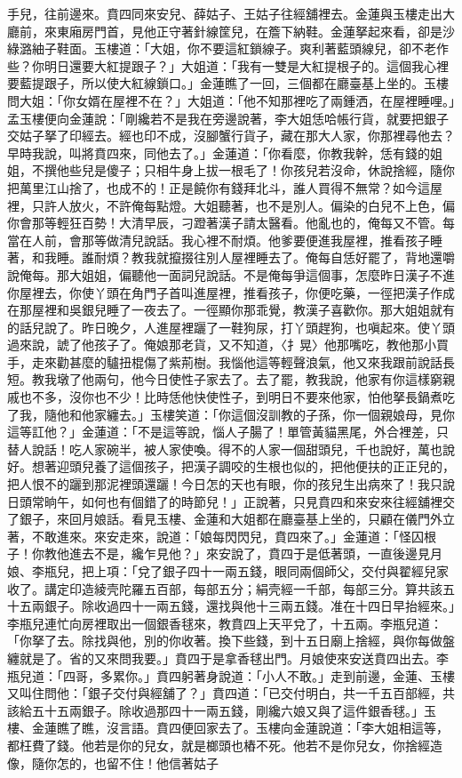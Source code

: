 \begin{showcontents}{}
手兒，往前邊來。賁四同來安兒、薛姑子、王姑子往經舖裡去。金蓮與玉樓走出大廳前，來東廂房門首，見他正守著針線筐兒，在簷下納鞋。金蓮拏起來看，卻是沙綠潞紬子鞋面。玉樓道：「大姐，你不要這紅鎖線子。爽利著藍頭線兒，卻不老作些？你明日還要大紅提跟子？」大姐道：「我有一雙是大紅提根子的。這個我心裡要藍提跟子，所以使大紅線鎖口。」金蓮瞧了一回，三個都在廳臺基上坐的。玉樓問大姐：「你女婿在屋裡不在？」大姐道：「他不知那裡吃了兩鍾洒，在屋裡睡哩。」孟玉樓便向金蓮說：「剛纔若不是我在旁邊說著，李大姐恁哈帳行貨，就要把銀子交姑子拏了印經去。經也印不成，沒腳蟹行貨子，藏在那大人家，你那裡尋他去？早時我說，叫將賁四來，同他去了。」金蓮道：「你看麼，你教我幹，恁有錢的姐姐，不撰他些兒是傻子；只相牛身上拔一根毛了！你孩兒若沒命，休說捨經，隨你把萬里江山捨了，也成不的！正是饒你有錢拜北斗，誰人買得不無常？如今這屋裡，只許人放火，不許俺每點燈。大姐聽著，也不是別人。偏染的白兒不上色，偏你會那等輕狂百勢！大清早辰，刁蹬著漢子請太醫看。他亂也的，俺每又不管。每當在人前，會那等做清兒說話。我心裡不耐煩。他爹要便進我屋裡，推看孩子睡著，和我睡。誰耐煩？教我就攛掇往別人屋裡睡去了。俺每自恁好罷了，背地還嚼說俺每。那大姐姐，偏聽他一面詞兒說話。不是俺每爭這個事，怎麼昨日漢子不進你屋裡去，你使丫頭在角門子首叫進屋裡，推看孩子，你便吃藥，一徑把漢子作成在那屋裡和吳銀兒睡了一夜去了。一徑顯你那乖覺，教漢子喜歡你。那大姐姐就有的話兒說了。昨日晚夕，人進屋裡躧了一鞋狗尿，打丫頭趕狗，也嗔起來。使丫頭過來說，諕了他孩子了。俺娘那老貨，又不知道，〈扌晃〉他那嘴吃，教他那小買手，走來勸甚麼的驢扭棍傷了紫荊樹。我惱他這等輕聲浪氣，他又來我跟前說話長短。教我墩了他兩句，他今日使性子家去了。去了罷，教我說，他家有你這樣窮親戚也不多，沒你也不少！比時恁他快使性子，到明日不要來他家，怕他拏長鍋煮吃了我，隨他和他家纏去。」玉樓笑道：「你這個沒訓教的子孫，你一個親娘母，見你這等訌他？」金蓮道：「不是這等說，惱人子腸了！單管黃貓黑尾，外合裡差，只替人說話！吃人家碗半，被人家使喚。得不的人家一個甜頭兒，千也說好，萬也說好。想著迎頭兒養了這個孩子，把漢子調咬的生根也似的，把他便扶的正正兒的，把人恨不的躧到那泥裡頭還躧！今日怎的天也有眼，你的孩兒生出病來了！我只說日頭常晌午，如何也有個錯了的時節兒！」正說著，只見賁四和來安來往經舖裡交了銀子，來回月娘話。看見玉樓、金蓮和大姐都在廳臺基上坐的，只顧在儀門外立著，不敢進來。來安走來，說道：「娘每閃閃兒，賁四來了。」金蓮道：「怪囚根子！你教他進去不是，纔乍見他？」來安說了，賁四于是低著頭，一直後邊見月娘、李瓶兒，把上項：「兌了銀子四十一兩五錢，眼同兩個師父，交付與翟經兒家收了。講定印造綾壳陀羅五百部，每部五分；絹壳經一千部，每部三分。算共該五十五兩銀子。除收過四十一兩五錢，還找與他十三兩五錢。准在十四日早抬經來。」李瓶兒連忙向房裡取出一個銀香毬來，教賁四上天平兌了，十五兩。李瓶兒道：「你拏了去。除找與他，別的你收著。換下些錢，到十五日廟上捨經，與你每做盤纏就是了。省的又來問我要。」賁四于是拿香毬出門。月娘使來安送賁四出去。李瓶兒道：「四哥，多累你。」賁四躬著身說道：「小人不敢。」走到前邊，金蓮、玉樓又叫住問他：「銀子交付與經舖了？」賁四道：「已交付明白，共一千五百部經，共該給五十五兩銀子。除收過那四十一兩五錢，剛纔六娘又與了這件銀香毬。」玉樓、金蓮瞧了瞧，沒言語。賁四便回家去了。玉樓向金蓮說道：「李大姐相這等，都枉費了錢。他若是你的兒女，就是榔頭也樁不死。他若不是你兒女，你捨經造像，隨你怎的，也留不住！他信著姑子
\end{showcontents}
